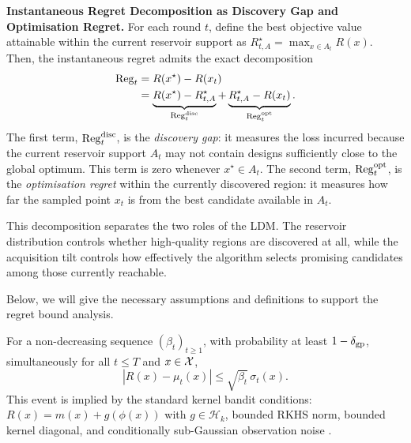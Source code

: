 \noindent\textbf{Instantaneous Regret Decomposition as Discovery Gap and Optimisation Regret.}
For each round \(t\), define the best objective value attainable within the current reservoir support as $R_{t,A}^\star = \max_{x \in A_t} R(x)$. Then, the instantaneous regret admits the exact decomposition
\begin{align}
\mathrm{Reg}_t
&= R(x^\star) - R(x_t) \\
&=
\underbrace{R(x^\star) - R_{t,A}^\star}_{\mathrm{Reg}_t^{\rm disc}}
+
\underbrace{R_{t,A}^\star - R(x_t)}_{\mathrm{Reg}_t^{\rm opt}} .
\end{align}
The first term, \(\mathrm{Reg}_t^{\rm disc}\), is the \emph{discovery gap}: it measures the loss incurred because the current reservoir support \(A_t\) may not contain designs sufficiently close to the global optimum. This term is zero whenever \(x^\star \in A_t\). The second term, \(\mathrm{Reg}_t^{\rm opt}\), is the \emph{optimisation regret} within the currently discovered region: it measures how far the sampled point \(x_t\) is from the best candidate available in \(A_t\).

This decomposition separates the two roles of the LDM. The reservoir distribution controls whether high-quality regions are discovered at all, while the acquisition tilt controls how effectively the algorithm selects promising candidates among those currently reachable.

Below, we will give the necessary assumptions and definitions to support the regret bound analysis. 
\begin{assumption}
\label{ass:ucb-calibration}
For a non-decreasing sequence $(\beta_t)_{t\ge1}$, with probability at least $1-\delta_{\rm gp}$, simultaneously
for all $t\le T$ and $x\in\mathcal{X}$,
\[
|R(x)-\mu_t(x)|
\le
\sqrt{\beta_t}\,\sigma_t(x).
\]
This event is implied by the standard kernel bandit conditions: $R(x)=m(x)+g(\phi(x))$ with $g\in\mathcal H_k$, bounded RKHS norm, bounded kernel diagonal, and conditionally sub-Gaussian observation noise \citep{srinivas2010gaussian,chowdhury2017kernelized}.
\end{assumption}

